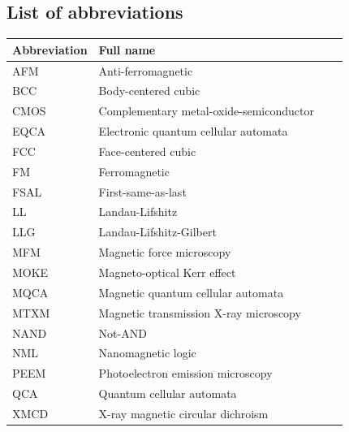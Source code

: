\documentclass[11pt,a4paper,english]{article}
\begin{document}
\subsection*{List of abbreviations}
\begin{longtable}{llll}
\toprule
\bfseries Abbreviation & \bfseries Full name \\\midrule\endhead
AFM & Anti-ferromagnetic \\
BCC & Body-centered cubic \\
CMOS & Complementary metal-oxide-semiconductor \\
EQCA & Electronic quantum cellular automata \\
FCC & Face-centered cubic \\
FM & Ferromagnetic \\
FSAL & First-same-as-last \\
LL & Landau-Lifshitz \\
LLG & Landau-Lifshitz-Gilbert \\
MFM & Magnetic force microscopy \\
MOKE & Magneto-optical Kerr effect \\
MQCA & Magnetic quantum cellular automata \\
MTXM & Magnetic transmission X-ray microscopy \\
NAND & Not-AND \\ %
NML & Nanomagnetic logic \\
PEEM & Photoelectron emission microscopy \\
QCA & Quantum cellular automata \\
XMCD & X-ray magnetic circular dichroism \\
\bottomrule
\end{longtable}
\end{document}
